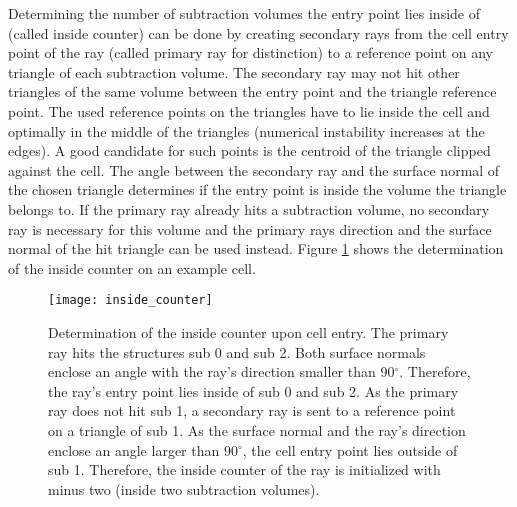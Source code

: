 Determining the number of subtraction volumes the entry point lies inside of (called inside counter) can be done by creating secondary rays from the cell entry point of the ray (called primary ray for distinction) to a reference point on any triangle of each subtraction volume. The secondary ray may not hit other triangles of the same volume between the entry point and the triangle reference point. The used reference points on the triangles have to lie inside the cell and optimally in the middle of the triangles (numerical instability increases at the edges). A good candidate for such points is the centroid of the triangle clipped against the cell. The angle between the secondary ray and the surface normal of the chosen triangle determines if the entry point is inside the volume the triangle belongs to. If the primary ray already hits a subtraction volume, no secondary ray is necessary for this volume and the primary rays direction and the surface normal of the hit triangle can be used instead. Figure \ref{fig:inside_counter} shows the determination of the inside counter on an example cell.

\begin{figure}
\centering
\texttt{[image: inside\_counter]}
\caption{Determination of the inside counter upon cell entry. The primary ray hits the structures sub 0 and sub 2. Both surface normals enclose an angle with the ray's direction smaller than 90$^\circ$. Therefore, the ray's entry point lies inside of sub 0 and sub 2. As the primary ray does not hit sub 1, a secondary ray is sent to a reference point on a triangle of sub 1. As the surface normal and the ray's direction enclose an angle larger than 90$^\circ$, the cell entry point lies outside of sub 1. Therefore, the inside counter of the ray is initialized with minus two (inside two subtraction volumes).}
\label{fig:inside_counter}
\end{figure}
